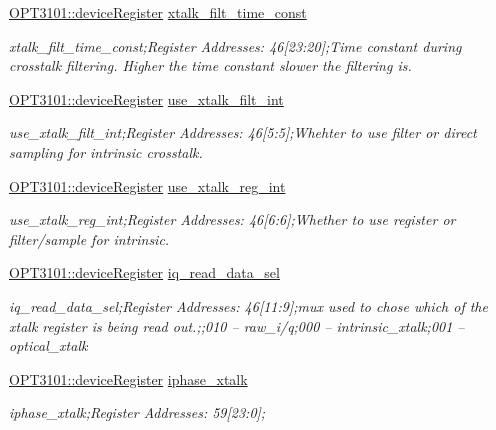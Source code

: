 \begin{DoxyCompactItemize}
\mbox{\hyperlink{class_o_p_t3101_1_1device_register}{O\+P\+T3101\+::device\+Register}} \mbox{\hyperlink{class_o_p_t3101_1_1registers_a83b64e27fde47db7e3553055be4a2328}{xtalk\+\_\+filt\+\_\+time\+\_\+const}}
\begin{DoxyCompactList}\small\item\em xtalk\+\_\+filt\+\_\+time\+\_\+const;Register Addresses\+: 46\mbox{[}23\+:20\mbox{]};Time constant during crosstalk filtering. Higher the time constant slower the filtering is. \end{DoxyCompactList}\item 
\mbox{\hyperlink{class_o_p_t3101_1_1device_register}{O\+P\+T3101\+::device\+Register}} \mbox{\hyperlink{class_o_p_t3101_1_1registers_a202e9df2cea455c7912307966fcc55ec}{use\+\_\+xtalk\+\_\+filt\+\_\+int}}
\begin{DoxyCompactList}\small\item\em use\+\_\+xtalk\+\_\+filt\+\_\+int;Register Addresses\+: 46\mbox{[}5\+:5\mbox{]};Whehter to use filter or direct sampling for intrinsic crosstalk. \end{DoxyCompactList}\item 
\mbox{\hyperlink{class_o_p_t3101_1_1device_register}{O\+P\+T3101\+::device\+Register}} \mbox{\hyperlink{class_o_p_t3101_1_1registers_ad52eabf99587324f45d95c70ed4b2b2e}{use\+\_\+xtalk\+\_\+reg\+\_\+int}}
\begin{DoxyCompactList}\small\item\em use\+\_\+xtalk\+\_\+reg\+\_\+int;Register Addresses\+: 46\mbox{[}6\+:6\mbox{]};Whether to use register or filter/sample for intrinsic. \end{DoxyCompactList}\item 
\mbox{\hyperlink{class_o_p_t3101_1_1device_register}{O\+P\+T3101\+::device\+Register}} \mbox{\hyperlink{class_o_p_t3101_1_1registers_aae2f6aa9624f013658f7cf7a08d1f0a9}{iq\+\_\+read\+\_\+data\+\_\+sel}}
\begin{DoxyCompactList}\small\item\em iq\+\_\+read\+\_\+data\+\_\+sel;Register Addresses\+: 46\mbox{[}11\+:9\mbox{]};mux used to chose which of the xtalk register is being read out.;;010 -- raw\+\_\+i/q;000 -- intrinsic\+\_\+xtalk;001 -- optical\+\_\+xtalk \end{DoxyCompactList}\item 
\mbox{\hyperlink{class_o_p_t3101_1_1device_register}{O\+P\+T3101\+::device\+Register}} \mbox{\hyperlink{class_o_p_t3101_1_1registers_ae87864da6c35bed7c34ebf5f26ba4513}{iphase\+\_\+xtalk}}
\begin{DoxyCompactList}\small\item\em iphase\+\_\+xtalk;Register Addresses\+: 59\mbox{[}23\+:0\mbox{]}; \end{DoxyCompactList}\item 

\end{DoxyCompactItemize}
